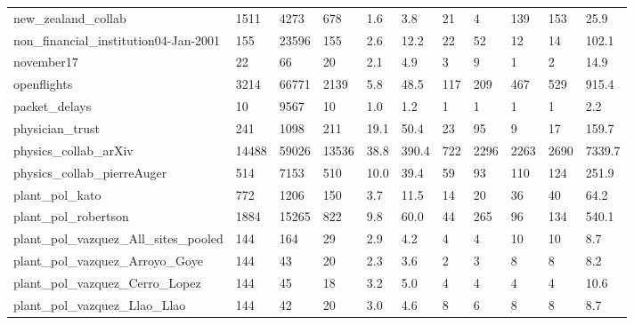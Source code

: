 \begin{longtable}{lllllllllll}
 new\_zealand\_collab                                 & 1511       & 4273      & 678   & 1.6    & 3.8    & 21    & 4      & 139    & 153    & 25.9    \\
 non\_financial\_institution04-Jan-2001               & 155        & 23596     & 155   & 2.6    & 12.2   & 22    & 52     & 12     & 14     & 102.1   \\
 november17                                         & 22         & 66        & 20    & 2.1    & 4.9    & 3     & 9      & 1      & 2      & 14.9    \\
 openflights                                        & 3214       & 66771     & 2139  & 5.8    & 48.5   & 117   & 209    & 467    & 529    & 915.4   \\
 packet\_delays                                      & 10         & 9567      & 10    & 1.0    & 1.2    & 1     & 1      & 1      & 1      & 2.2     \\
 physician\_trust                                    & 241        & 1098      & 211   & 19.1   & 50.4   & 23    & 95     & 9      & 17     & 159.7   \\
 physics\_collab\_arXiv                               & 14488      & 59026     & 13536 & 38.8   & 390.4  & 722   & 2296   & 2263   & 2690   & 7339.7  \\
 physics\_collab\_pierreAuger                         & 514        & 7153      & 510   & 10.0   & 39.4   & 59    & 93     & 110    & 124    & 251.9   \\
 plant\_pol\_kato                                     & 772        & 1206      & 150   & 3.7    & 11.5   & 14    & 20     & 36     & 40     & 64.2    \\
 plant\_pol\_robertson                                & 1884       & 15265     & 822   & 9.8    & 60.0   & 44    & 265    & 96     & 134    & 540.1   \\
 plant\_pol\_vazquez\_All\_sites\_pooled                 & 144        & 164       & 29    & 2.9    & 4.2    & 4     & 4      & 10     & 10     & 8.7     \\
 plant\_pol\_vazquez\_Arroyo\_Goye                      & 144        & 43        & 20    & 2.3    & 3.6    & 2     & 3      & 8      & 8      & 8.2     \\
 plant\_pol\_vazquez\_Cerro\_Lopez                      & 144        & 45        & 18    & 3.2    & 5.0    & 4     & 4      & 4      & 4      & 10.6    \\
 plant\_pol\_vazquez\_Llao\_Llao                        & 144        & 42        & 20    & 3.0    & 4.6    & 8     & 6      & 8      & 8      & 8.7     \\

\end{longtable}
